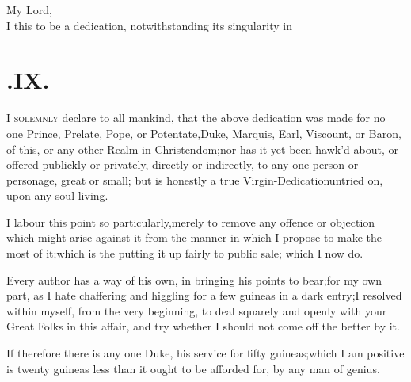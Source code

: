 \documentclass{article}
\begin{document}
My Lord,\\[-24pt]
\lettrine{\lower-12pt\hbox{\normalsize \lqq }I}{ } this to
be a dedication,\break
notwithstanding its singularity in\break
{}

\noindent{}
\vskip 36pt
\newpage
\section{.\enspace IX.}

\lettrine{I}{ solemnly} declare to all mankind,
that the above dedication was made for no one Prince, Prelate,
Pope, or Potentate,\tsk  Duke, Marquis, Earl, Viscount, or Baron, of this, or any other Realm in
Christendom;\tsh  nor has it yet been hawk’d about, or
offered publickly or privately, directly or indirectly, to any one
person or personage, great or small; but is honestly a true
Virgin-Dedication\break untried on, upon any soul living.

I labour this point so particularly,\break merely to remove any
offence or objection which might arise against it from the manner
in which I propose to make the most of it;\tsk  which is the
putting it up fairly to public sale; which I now do.

\tsh  Every author has a way of his
own, in bringing his points to bear;\tsk  for
my own part, as I hate chaffering and
higgling for a few guineas in a dark\break
entry;\tsk  I resolved within myself, from
the very beginning, to deal squarely and 
openly with your Great Folks in this affair, 
and try whether I should not come
off the better by it.

If therefore there is any one Duke, 
his service for fifty guineas;\tsh  which
I am positive is twenty guineas less
than it ought to be afforded for, by any man of genius.
\end{document}
